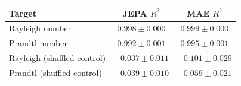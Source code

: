 \begin{tabular}{lcc}
\toprule
Target & JEPA $R^2$ & MAE $R^2$ \\
\midrule
Rayleigh number & $0.998 \pm 0.000$ & $0.999 \pm 0.000$ \\
Prandtl number & $0.992 \pm 0.001$ & $0.995 \pm 0.001$ \\
Rayleigh (shuffled control) & $-0.037 \pm 0.011$ & $-0.101 \pm 0.029$ \\
Prandtl (shuffled control) & $-0.039 \pm 0.010$ & $-0.059 \pm 0.021$ \\
\bottomrule
\end{tabular}
